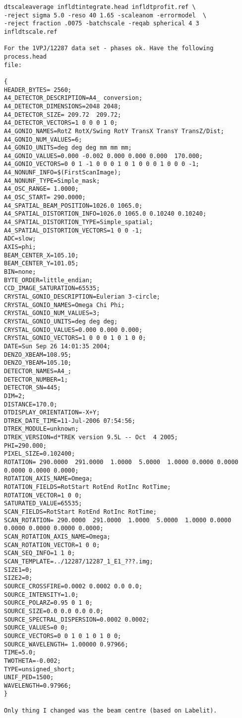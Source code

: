 \documentclass[a4paper, 11pt]{article}
\begin{document}
{\begin{verbatim}
dtscaleaverage infldtintegrate.head infldtprofit.ref \
-reject sigma 5.0 -reso 40 1.65 -scaleanom -errormodel  \
-reject fraction .0075 -batchscale -reqab spherical 4 3 infldtscale.ref 

For the 1VPJ/12287 data set - phases ok. Have the following process.head
file:

{
HEADER_BYTES= 2560;
A4_DETECTOR_DESCRIPTION=A4_ conversion;
A4_DETECTOR_DIMENSIONS=2048 2048;
A4_DETECTOR_SIZE= 209.72  209.72;
A4_DETECTOR_VECTORS=1 0 0 0 1 0;
A4_GONIO_NAMES=RotZ RotX/Swing RotY TransX TransY TransZ/Dist;
A4_GONIO_NUM_VALUES=6;
A4_GONIO_UNITS=deg deg deg mm mm mm;
A4_GONIO_VALUES=0.000 -0.002 0.000 0.000 0.000  170.000;
A4_GONIO_VECTORS=0 0 1 -1 0 0 0 1 0 1 0 0 0 1 0 0 0 -1;
A4_NONUNF_INFO=$(FirstScanImage);
A4_NONUNF_TYPE=Simple_mask;
A4_OSC_RANGE= 1.0000;
A4_OSC_START= 290.0000;
A4_SPATIAL_BEAM_POSITION=1026.0 1065.0; 
A4_SPATIAL_DISTORTION_INFO=1026.0 1065.0 0.10240 0.10240;
A4_SPATIAL_DISTORTION_TYPE=Simple_spatial;
A4_SPATIAL_DISTORTION_VECTORS=1 0 0 -1;
ADC=slow;
AXIS=phi;
BEAM_CENTER_X=105.10;
BEAM_CENTER_Y=101.05;
BIN=none;
BYTE_ORDER=little_endian;
CCD_IMAGE_SATURATION=65535;
CRYSTAL_GONIO_DESCRIPTION=Eulerian 3-circle;
CRYSTAL_GONIO_NAMES=Omega Chi Phi;
CRYSTAL_GONIO_NUM_VALUES=3;
CRYSTAL_GONIO_UNITS=deg deg deg;
CRYSTAL_GONIO_VALUES=0.000 0.000 0.000;
CRYSTAL_GONIO_VECTORS=1 0 0 0 1 0 1 0 0;
DATE=Sun Sep 26 14:01:35 2004;
DENZO_XBEAM=108.95;
DENZO_YBEAM=105.10;
DETECTOR_NAMES=A4_;
DETECTOR_NUMBER=1;
DETECTOR_SN=445;
DIM=2;
DISTANCE=170.0;
DTDISPLAY_ORIENTATION=-X+Y;
DTREK_DATE_TIME=11-Jul-2006 07:54:56;
DTREK_MODULE=unknown;
DTREK_VERSION=d*TREK version 9.5L -- Oct  4 2005;
PHI=290.000;
PIXEL_SIZE=0.102400;
ROTATION= 290.0000  291.0000  1.0000  5.0000  1.0000 0.0000 0.0000 0.0000 0.0000 0.0000;
ROTATION_AXIS_NAME=Omega;
ROTATION_FIELDS=RotStart RotEnd RotInc RotTime;
ROTATION_VECTOR=1 0 0;
SATURATED_VALUE=65535;
SCAN_FIELDS=RotStart RotEnd RotInc RotTime;
SCAN_ROTATION= 290.0000  291.0000  1.0000  5.0000  1.0000 0.0000 0.0000 0.0000 0.0000 0.0000;
SCAN_ROTATION_AXIS_NAME=Omega;
SCAN_ROTATION_VECTOR=1 0 0;
SCAN_SEQ_INFO=1 1 0;
SCAN_TEMPLATE=../12287/12287_1_E1_???.img;
SIZE1=0;
SIZE2=0;
SOURCE_CROSSFIRE=0.0002 0.0002 0.0 0.0;
SOURCE_INTENSITY=1.0;
SOURCE_POLARZ=0.95 0 1 0;
SOURCE_SIZE=0.0 0.0 0.0 0.0;
SOURCE_SPECTRAL_DISPERSION=0.0002 0.0002;
SOURCE_VALUES=0 0;
SOURCE_VECTORS=0 0 1 0 1 0 1 0 0;
SOURCE_WAVELENGTH= 1.00000 0.97966;
TIME=5.0;
TWOTHETA=-0.002;
TYPE=unsigned_short;
UNIF_PED=1500;
WAVELENGTH=0.97966;
}

Only thing I changed was the beam centre (based on Labelit).

\end{verbatim}
}
\end{document}
